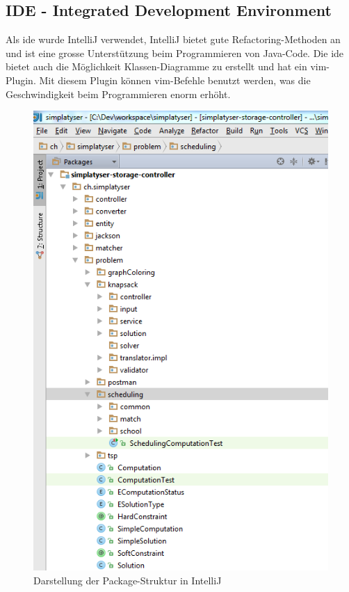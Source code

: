 \subsection{IDE - Integrated Development Environment}
Als \gls{ide} wurde IntelliJ verwendet, IntelliJ bietet gute Refactoring-Methoden an und ist eine grosse Unterstützung beim Programmieren von Java-Code. Die \gls{ide} 
bietet auch die Möglichkeit Klassen-Diagramme zu erstellt und hat ein \gls{vim}-Plugin. Mit diesem Plugin können \gls{vim}-Befehle benutzt werden, was die 
Geschwindigkeit beim Programmieren enorm erhöht.

\begin{figure}[h]
\centering
\includegraphics[scale=0.7]{images/IntelliJ.png}
\caption[Darstellung der Package-Struktur in IntelliJ]{Darstellung der Package-Struktur in IntelliJ \selfmade{}}
\label{fig:IntelliJ}
\end{figure}

